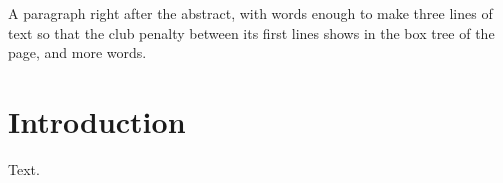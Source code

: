 \documentclass{report}
\begin{document}
\tableofcontents
\begin{abstract}
An abstract after the contents, long enough to wrap onto a second line of text on its page here.
\end{abstract}
A paragraph right after the abstract, with words enough to make three lines of text so that the club penalty between its first lines shows in the box tree of the page, and more words.
\chapter{Introduction}
Text.
\end{document}
